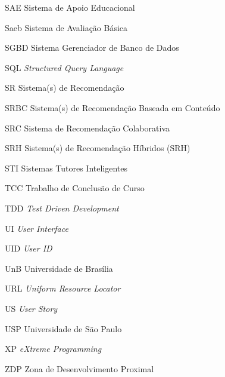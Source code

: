 \begin{siglas}
  \item[SAE] Sistema de Apoio Educacional
  \item[Saeb] Sistema de Avaliação Básica
  \item[SGBD] Sistema Gerenciador de Banco de Dados
  \item[SQL] \textit
  {Structured Query Language}
  \item[SR] Sistema(s) de Recomendação
  \item[SRBC] Sistema(s) de Recomendação Baseada em Conteúdo
  \item[SRC] Sistema de Recomendação Colaborativa
  \item[SRH] Sistema(s) de Recomendação Híbridos (SRH)
  \item[STI] Sistemas Tutores Inteligentes
  \item[TCC] Trabalho de Conclusão de Curso
  \item[TDD] \textit{Test Driven Development}
  \item[UI] \textit{User Interface}
  \item[UID] \textit{User ID}
  \item[UnB] Universidade de Brasília
  \item[URL] \textit{Uniform Resource Locator}
  \item[US] \textit{User Story}
  \item[USP] Universidade de São Paulo
  \item[XP] \textit{eXtreme Programming}
  \item[ZDP] Zona de Desenvolvimento Proximal
\end{siglas}